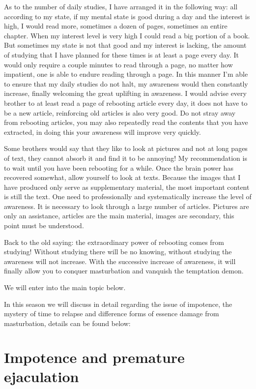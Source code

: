 \documentclass[
]{book}
\begin{document}
As to the number of daily studies, I have arranged it in the following way: all according to my state, if my mental state is good during a day and the interest is high, I would read more, sometimes a dozen of pages, sometimes an entire chapter. When my interest level is very high I could read a big portion of a book. But sometimes my state is not that good and my interest is lacking, the amount of studying that I have planned for these times is at least a page every day. It would only require a couple minutes to read through a page, no matter how impatient, one is able to endure reading through a page. In this manner I'm able to ensure that my daily studies do not halt, my awareness would then constantly increase, finally welcoming the great uplifting in awareness. I would advise every brother to at least read a page of rebooting article every day, it does not have to be a new article, reinforcing old articles is also very good. Do not stray away from rebooting articles, you may also repeatedly read the contents that you have extracted, in doing this your awareness will improve very quickly.

Some brothers would say that they like to look at pictures and not at long pages of text, they cannot absorb it and find it to be annoying! My recommendation is to wait until you have been rebooting for a while. Once the brain power has recovered somewhat, allow yourself to look at texts. Because the images that I have produced only serve as supplementary material, the most important content is still the text. One need to professionally and systematically increase the level of awareness. It is necessary to look through a large number of articles. Pictures are only an assistance, articles are the main material, images are secondary, this point must be understood.

Back to the old saying: the extraordinary power of rebooting comes from studying! Without studying there will be no knowing, without studying the awareness will not increase. With the successive increase of awareness, it will finally allow you to conquer masturbation and vanquish the temptation demon.

We will enter into the main topic below.

In this season we will discuss in detail regarding the issue of impotence, the mystery of time to relapse and difference forms of essence damage from masturbation, details can be found below:

\hypertarget{impotence-and-premature-ejaculation}{%
\section{Impotence and premature ejaculation}\label{impotence-and-premature-ejaculation}}
\end{document}
